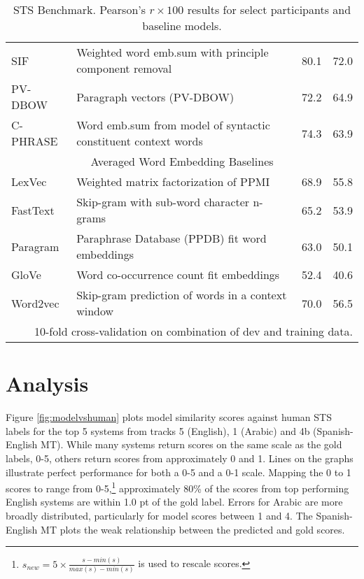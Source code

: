 \documentclass[11pt,a4paper]{article}
\begin{document}
\begin{table*}[t]
\begin{center}
\begin{tabular}{|l|l|r|r|}
SIF & Weighted word emb.\@ sum with principle component removal \cite{sif2017} & 80.1 & 72.0 \\
PV-DBOW & Paragraph vectors (PV-DBOW) \cite{quocle2014,Lau2016} & 72.2 & 64.9 \\
C-PHRASE & Word emb.\@ sum from model of syntactic constituent context words \cite{pham2015} & 74.3 & 63.9 \\
\hline
\multicolumn{4}{|c|}{Averaged Word Embedding Baselines} \\
\hline
LexVec & Weighted matrix factorization of PPMI \cite{Salle2016arxiv,Salle2016acl} & 68.9 & 55.8 \\
FastText & Skip-gram with sub-word character n-grams \cite{Joulin2016} & 65.2 & 53.9 \\
Paragram & Paraphrase Database (PPDB) fit word embeddings \cite{Wieting2015tacl} & 63.0 & 50.1 \\
GloVe & Word co-occurrence count fit embeddings \cite{pennington2014glove} & 52.4 & 40.6\\
Word2vec & Skip-gram prediction of words in a context window \cite{mikolov2013arxiv,mikolov2013nips} & 70.0 & 56.5 \\
\hline
\multicolumn{4}{r}{\footnotesize * 10-fold cross-validation on combination of dev and training data.} \\
\end{tabular}
\end{center}
\caption{STS Benchmark. Pearson's $r \times 100$ results for select participants and baseline models.}
\label{tab:stsbenchmarkresults}
\end{table*}
\section{Analysis}

Figure \ref{fig:modelvshuman} plots model similarity scores against human STS labels for the top 5 systems from tracks 5 (English), 1 (Arabic) and 4b (Spanish-English MT). While many systems return scores on the same scale as the gold labels, 0-5, others return scores from approximately 0 and 1. Lines on the graphs illustrate perfect performance for both a 0-5 and a 0-1 scale. Mapping the 0 to 1 scores to range from 0-5,\footnote{$s_{new} = 5 \times \frac{s-min(s)}{max(s)-min(s)}$ is used to rescale scores.} approximately 80\% of the scores from top performing English systems are within 1.0 pt of the gold label. Errors for Arabic are more broadly distributed, particularly for model scores between 1 and 4. The Spanish-English MT plots the weak relationship between the predicted and gold scores. 
\end{document}
